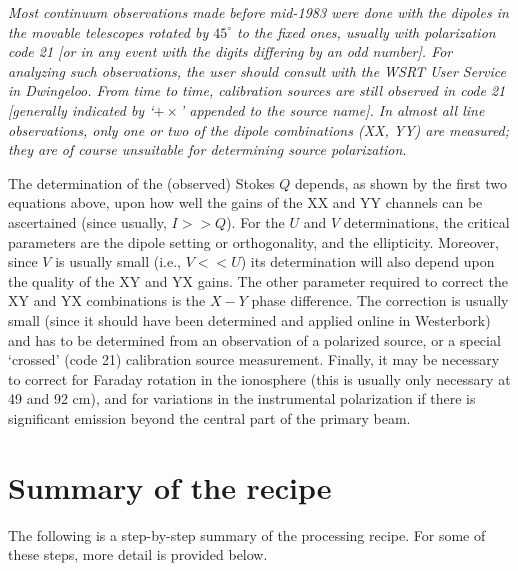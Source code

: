 {\em Most continuum observations made before mid-1983 were done with the
dipoles in the movable telescopes rotated by $45^\circ$ to the fixed ones,
usually with polarization code 21 [or in any event with the digits differing by
an odd number]. For analyzing such observations, the user should consult with
the WSRT User Service in Dwingeloo. From time to time, calibration sources are
still observed in code 21 [generally indicated by `$+\times$' appended to the
source name]. In almost all line observations, only one or two of the dipole
combinations (XX, YY) are measured; they are of course unsuitable for
determining source polarization.}

The determination of the (observed) Stokes $Q$ depends, as shown by the first
two equations above, upon how well the gains of the XX and YY channels can be
ascertained (since usually, $I>>Q$). For the $U$ and $V$ determinations, the
critical parameters are the dipole setting or orthogonality, and the
ellipticity. Moreover, since $V$ is usually small (i.e., $V<<U$) its
determination will also depend upon the quality of the XY and YX gains. The
other parameter required to correct the XY and YX combinations is the $X-Y$
phase difference. The correction is usually small (since it should have been
determined and applied online in Westerbork) and has to be determined from an
observation of a polarized source, or a special `crossed' (code 21) calibration
source measurement. Finally, it may be necessary to correct for Faraday
rotation in the ionosphere (this is usually only necessary at 49 and 92 cm),
and for variations in the instrumental polarization if there is significant
emission beyond the central part of the primary beam.

\section{Summary of the recipe}
\label{.summary}

The following is a step-by-step summary of the processing recipe. For some of
these steps, more detail is provided below.

